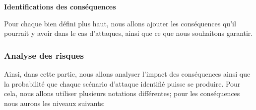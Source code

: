 \textbf{Identifications des conséquences}

Pour chaque bien défini plus haut, nous allons ajouter les conséquences qu'il pourrait y avoir dans le cas d'attaques, ainsi que ce que nous souhaitons garantir.

\begin{table}[H]
	\centering
	\caption{Conséquences des menaces sur l'entreprise}
\end{table}

\subsubsection{Analyse des risques}
Ainsi, dans cette partie, nous allons analyser l'impact des conséquences ainsi que la probabilité que chaque scénario d'attaque identifié puisse se produire. Pour cela, nous allons utiliser plusieurs notations différentes; pour les conséquences nous aurons les niveaux suivants:

